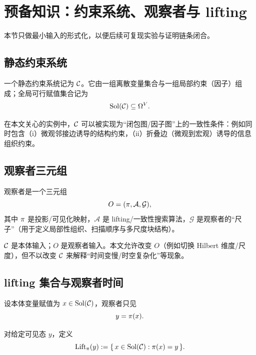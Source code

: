 \section{预备知识：约束系统、观察者与 lifting}

本节只做最小输入的形式化，以便后续可复现实验与证明链条闭合。

\subsection{静态约束系统}

\begin{definition}[约束系统]
一个静态约束系统记为 \(\mathcal{C}\)。它由一组离散变量集合与一组局部约束（因子）组成；全局可行赋值集合记为
\[
\mathrm{Sol}(\mathcal{C})\subseteq \Omega^{V}.
\]
\end{definition}

在本文关心的实例中，\(\mathcal{C}\) 可以被实现为“闭包图/因子图”上的一致性条件：例如同时包含（i）微观邻接边诱导的结构约束，（ii）折叠边（微观到宏观）诱导的信息组织约束。

\subsection{观察者三元组}

\begin{definition}[观察者]
观察者是一个三元组
\[
O=(\pi,\mathcal A,\mathcal G),
\]
其中 \(\pi\) 是投影/可见化映射，\(\mathcal A\) 是 lifting/一致性搜索算法，\(\mathcal G\) 是观察者的“尺子”（用于定义局部性组织、扫描顺序与多尺度块结构）。
\end{definition}

\begin{remark}[最小输入原则下的角色分离]
\(\mathcal{C}\) 是本体输入；\(O\) 是观察者输入。本文允许改变 \(O\)（例如切换 Hilbert 维度/尺度），但不以改变 \(\mathcal{C}\) 来解释“时间变慢/时空复杂化”等现象。
\end{remark}

\subsection{lifting 集合与观察者时间}

设本体变量赋值为 \(x\in\mathrm{Sol}(\mathcal{C})\)，观察者只见
\[
y=\pi(x).
\]

\begin{definition}[lifting 集合]
对给定可见态 \(y\)，定义
\[
\mathrm{Lift}_{\pi}(y):=\{\,x\in \mathrm{Sol}(\mathcal{C}): \pi(x)=y\,\}.
\]
\end{definition}

